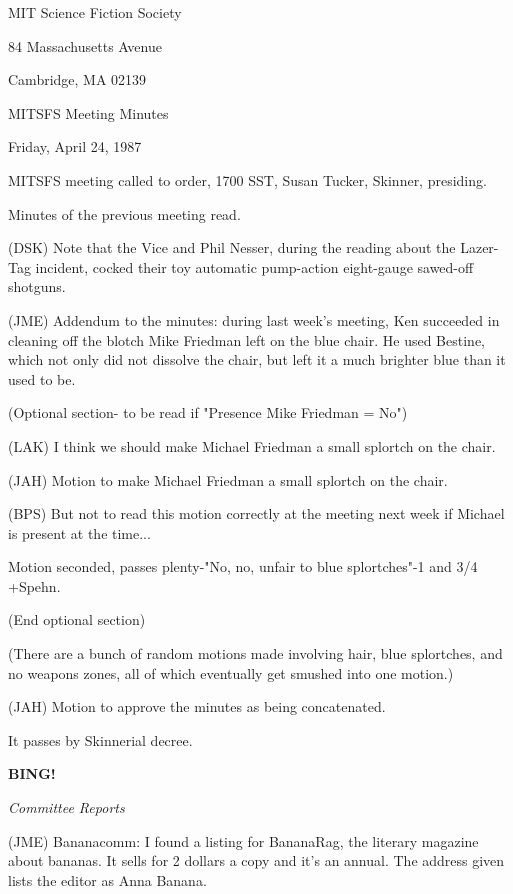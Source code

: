 \documentclass[12pt]{article}
\newcommand{\bing}{{\bf BING!} }
\newcommand{\goto}[1]{\bing \vskip 12pt \centerline{{\em{#1}}}}
\begin{document}
\begin{center}

MIT Science Fiction Society 

84 Massachusetts Avenue

Cambridge, MA 02139

\vspace{12pt}

MITSFS Meeting Minutes 

Friday, April 24, 1987

\end{center}
 
\vspace{18pt}

\setlength{\parskip}{6pt}

\noindent
MITSFS meeting called to order, 1700 SST,
Susan Tucker, Skinner, presiding.

Minutes of the previous meeting read.

(DSK) Note that the Vice and Phil Nesser, during the reading about the Lazer-Tag incident, cocked their toy automatic pump-action eight-gauge sawed-off shotguns.

(JME) Addendum to the minutes: during last week's meeting, Ken succeeded in cleaning off the blotch Mike Friedman left on the blue chair. He used Bestine, which not only did not dissolve the chair, but left it a much brighter blue than it used to be.

(Optional section- to be read if "Presence Mike Friedman = No")

(LAK) I think we should make Michael Friedman a small splortch on the chair.

(JAH) Motion to make Michael Friedman a small splortch on the chair.

(BPS) But not to read this motion correctly at the meeting next week if Michael is present at the time...

Motion seconded, passes plenty-"No, no, unfair to blue splortches"-1 and 3/4 +Spehn.

(End optional section)

(There are a bunch of random motions made involving hair, blue splortches, and no weapons zones, all of which eventually get smushed into one motion.)

(JAH) Motion to approve the minutes as being concatenated.

It passes by Skinnerial decree.

\goto{Committee Reports}

(JME) Bananacomm: I found a listing for BananaRag, the literary magazine about bananas. It sells for 2 dollars a copy and it's an annual. The address given lists the editor as Anna Banana.
\end{document}
